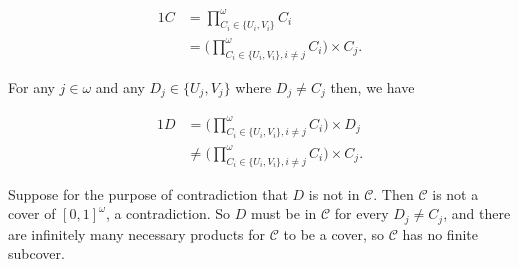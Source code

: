 \documentclass{article}
\begin{document}
\begin{alignat*}{1}
    C &= \prod _{C_i \in \{U_i, V_i\}}^\omega C_i \\ 
    &= \bigg(  \prod _{C_i \in \{U_i, V_i\}, i \neq j}^\omega C_i \bigg) \times C_j .
\end{alignat*}

For any $j \in \omega$ and any $D_j \in \{U_j, V_j\}$ where $D_j \neq C_j$ then, we have 

\begin{alignat*}{1}
    D &= \bigg(  \prod _{C_i \in \{U_i, V_i\}, i \neq j}^\omega C_i \bigg) \times D_j \\ 
    &\neq \bigg(  \prod _{C_i \in \{U_i, V_i\}, i \neq j}^\omega C_i \bigg) \times C_j.
\end{alignat*}

Suppose for the purpose of contradiction that $D$ is not in $\mathcal{C}$.  Then $\mathcal{C}$ 
is not a cover of $[0, 1]^\omega$, a contradiction.  So $D$ must be in $\mathcal{C}$ for 
every $D_j \neq C_j$, and there are infinitely many necessary products for $\mathcal{C}$ 
to be a cover, so $\mathcal{C}$ has no finite subcover.
\end{document}
